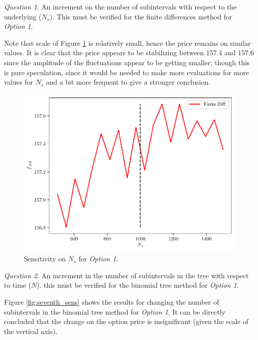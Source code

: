 \documentclass[11pt]{article}
\theoremstyle{definition}
\theoremstyle{remark}
\theoremstyle{remark}
\newtheorem{question}{Question}
\begin{document}
\begin{question}
  An increment on the number of subintervals with respect to the underlying
  ($N_s$). This must be verified for the finite differences method for
  \textit{Option 1}.
\end{question}

Note that scale of Figure \ref{fig:sixth_sens} is relatively small, hence the
price remains on similar values. It is clear that the price appears to be
stabilizing between 157.4 and 157.6 since the amplitude of the fluctuations
appear to be getting smaller; though this is pure speculation, since it would be
needed to make more evaluations for more values for $N_s$ and a bit more
frequent to give a stronger conclusion.

\begin{figure}[H]
    \centering
    \includegraphics[scale=0.5]{../plts/sixth_sens_opt1.pdf}
    \caption{Sensitivity on $N_s$ for \textit{Option 1}.}
    \label{fig:sixth_sens}
\end{figure}

\begin{question}
  An increment in the number of subintervals in the tree with respect to time
  ($N$). this must be verified for the binomial tree method for \textit{Option
    1}.
\end{question}
Figure \ref{fig:seventh_sens} shows the results for changing the number of
subintervals in the binomial tree method for \textit{Option 1}. It can be
directly concluded that the change on the option price is insignificant (given
the scale of the vertical axis).
\end{document}
